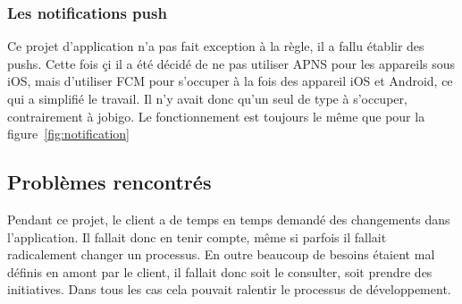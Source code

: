 \documentclass[rapport.tex]{subfiles}
\begin{document}
        \subsubsection{Les notifications push}
        Ce projet d'application n'a pas fait exception à la règle, il a fallu établir des \glspl{push}.
        Cette fois çi il a été décidé de ne pas utiliser APNS pour les appareils sous iOS, mais d'utiliser 
        FCM pour s'occuper à la fois des appareil iOS et Android, ce qui a simplifié le travail. Il n'y avait donc
        qu'un seul de type à s'occuper, contrairement à jobigo. Le fonctionnement est toujours le même que pour la 
        figure~\ref{fig:notification}

        \subsection{Problèmes rencontrés}
        Pendant ce projet, le client a de temps en temps demandé des changements dans l'application. Il fallait donc en tenir
        compte, même si parfois il fallait radicalement changer un processus. En outre beaucoup de besoins étaient mal définis
        en amont par le client, il fallait donc soit le consulter, soit prendre des initiatives. Dans tous les cas cela pouvait ralentir le
        processus de développement.
        
\end{document}
